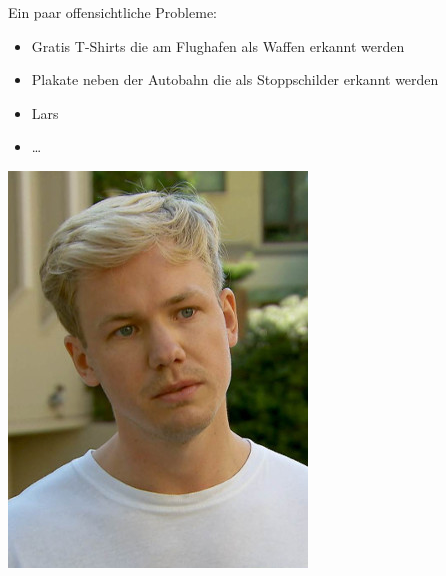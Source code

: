 \documentclass[aspectratio=43,x11names]{beamer}
\begin{document}
\begin{frame}
Ein paar offensichtliche Probleme:
\bigskip
\begin{multicols}{2}
\begin{itemize}
\item Gratis T-Shirts die am Flughafen als Waffen erkannt werden
\item Plakate neben der Autobahn die als Stoppschilder erkannt werden
\item Lars
\item \dots
\end{itemize}
\columnbreak
\includegraphics[scale=0.45]{images/lars_sweden.jpg} 
\end{multicols}
\end{frame}
\end{document}

